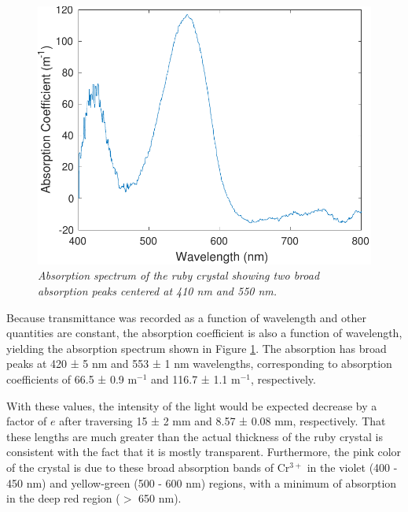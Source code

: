 \documentclass[11pt, a4paper, twocolumn]{article}
\begin{document}
\begin{figure}[H]
\includegraphics[width=\linewidth]{absorptionSpectrumFocused.pdf}
\caption{\textit{Absorption spectrum of the ruby crystal showing two broad absorption peaks centered at 410 nm and 550 nm.}}
\label{fig:absorptionSpectrumFocused}
\end{figure}



Because transmittance was recorded as a function of wavelength and other quantities are constant, the absorption coefficient is also a function of wavelength, yielding the absorption spectrum shown in Figure \ref{fig:absorptionSpectrumFocused}. The absorption has broad peaks at 420 ± 5 nm and 553 ± 1 nm wavelengths, corresponding to absorption coefficients of 66.5 ± 0.9 m$^{-1}$ and 116.7 ± 1.1 m$^{-1}$, respectively. 

With these values, the intensity of the light would be expected decrease by a factor of $e$ after traversing 15 ± 2 mm and 8.57 ± 0.08 mm, respectively. That these lengths are much greater than the actual thickness of the ruby crystal is consistent with the fact that it is mostly transparent. Furthermore, the pink color of the crystal is due to these broad absorption bands of Cr$^{3+}$ in the violet (400 - 450 nm) and yellow-green (500 - 600 nm) regions, with a minimum of absorption in the deep red region ($>$ 650 nm).
\end{document}
